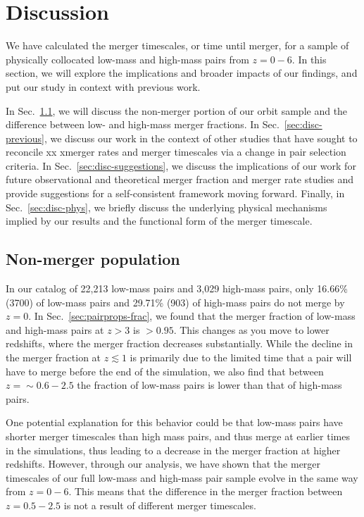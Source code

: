 \documentclass[twocolumn,linenumbers]{aastex631}
\begin{document}
\section{Discussion} \label{sec:discussion}
    We have calculated the merger timescales, or time until merger, for a sample of physically collocated low-mass and high-mass pairs from $z=0-6$.
    In this section, we will explore the implications and broader impacts of our findings, and put our study in context with previous work. 
    
    In Sec.~\ref{sec:disc-nonmergers}, we will discuss the non-merger portion of our orbit sample and the difference between low- and high-mass merger fractions.
    In Sec.~\ref{sec:disc-previous}, we discuss our work in the context of other studies that have sought to reconcile xx xmerger rates and merger timescales via a change in pair selection criteria. 
    In Sec.~\ref{sec:disc-suggestions}, we discuss the implications of our work for future observational and theoretical merger fraction and merger rate studies and provide suggestions for a self-consistent framework moving forward.
    Finally, in Sec.~\ref{sec:disc-phys}, we briefly discuss the underlying physical mechanisms implied by our results and the functional form of the merger timescale. 
    

    \subsection{Non-merger population}\label{sec:disc-nonmergers}
    In our catalog of 22,213 low-mass pairs and 3,029 high-mass pairs, only 16.66\% (3700) of low-mass pairs and 29.71\% (903) of high-mass pairs do not merge by $z=0$.
    In Sec.~\ref{sec:pairprops-frac}, we found that the merger fraction of low-mass and high-mass pairs at $z>3$ is $>0.95$. 
    This changes as you move to lower redshifts, where the merger fraction decreases substantially. 
    While the decline in the merger fraction at $z\lesssim1$ is primarily due to the limited time that a pair will have to merge before the end of the simulation, we also find that between $z=\sim0.6-2.5$ the fraction of low-mass pairs is lower than that of high-mass pairs. 
    
    One potential explanation for this behavior could be that low-mass pairs have shorter merger timescales than high mass pairs, and thus merge at earlier times in the simulations, thus leading to a decrease in the merger fraction at higher redshifts. 
    However, through our analysis, we have shown that the merger timescales of our full low-mass and high-mass pair sample evolve in the same way from $z=0-6$. 
    This means that the difference in the merger fraction between $z=0.5-2.5$ is not a result of different merger timescales.
\end{document}
